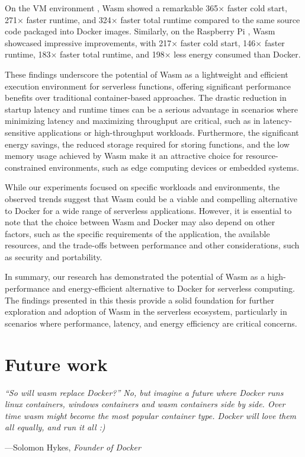 \documentclass[
  table]{report}
\begin{document}
On the VM environment , Wasm showed a remarkable 365×
faster cold start, 271× faster runtime, and 324× faster total runtime
compared to the same source code packaged into Docker images. Similarly,
on the Raspberry Pi , Wasm showcased impressive
improvements, with 217× faster cold start, 146× faster runtime, 183×
faster total runtime, and 198× less energy consumed than Docker.

These findings underscore the potential of Wasm as a lightweight and
efficient execution environment for serverless functions, offering
significant performance benefits over traditional container-based
approaches. The drastic reduction in startup latency and runtime times
can be a serious advantage in scenarios where minimizing latency and
maximizing throughput are critical, such as in latency-sensitive
applications or high-throughput workloads. Furthermore, the significant
energy savings, the reduced storage required for storing functions, and
the low memory usage \citep{shillakerFaasmLightweightIsolation2020a}
achieved by \ac{Wasm} make it an attractive choice for
resource-constrained environments, such as edge computing devices or
embedded systems.

While our experiments focused on specific workloads and environments,
the observed trends suggest that Wasm could be a viable and compelling
alternative to Docker for a wide range of serverless applications.
However, it is essential to note that the choice between Wasm and Docker
may also depend on other factors, such as the specific requirements of
the application, the available resources, and the trade-offs between
performance and other considerations, such as security and portability.

In summary, our research has demonstrated the potential of Wasm as a
high-performance and energy-efficient alternative to Docker for
serverless computing. The findings presented in this thesis provide a
solid foundation for further exploration and adoption of Wasm in the
serverless ecosystem, particularly in scenarios where performance,
latency, and energy efficiency are critical concerns.

\newpage
\chapter{Future work}

\setlength{}

\epigraph{\itshape 
“So will wasm replace Docker?” No, but imagine a future where Docker runs linux
containers, windows containers and wasm containers side by side. Over time wasm
might become the most popular container type. Docker will love them all equally,
and run it all :)
}{---Solomon Hykes, \textit{Founder of Docker}}
\end{document}

